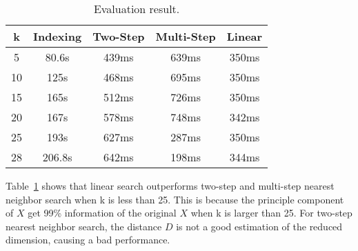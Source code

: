 \documentclass{article}
\begin{document}
\begin{table}[tbh]
  \center
  \footnotesize
  \begin{tabular}{c|c|c|c|c}
    \textbf{k} & \textbf{Indexing} & \textbf{Two-Step} & \textbf{Multi-Step} & \textbf{Linear}\\
    \hline
    5 & 80.6s & 439ms & 639ms & 350ms\\
    \hline
    10 & 125s & 468ms & 695ms & 350ms \\
    \hline
    15 & 165s & 512ms & 726ms & 350ms \\
    \hline
    20 & 167s & 578ms & 748ms & 342ms \\
    \hline
    25 & 193s & 627ms & 287ms & 350ms \\
    \hline
    28 & 206.8s & 642ms & 198ms & 344ms \\
  \end{tabular}
  \caption{Evaluation result.}
  \label{result}
\end{table}

Table~\ref{result} shows that linear search outperforms two-step and multi-step
nearest neighbor search when k is less than 25. This is because the principle
component of $X$ get 99\% information of the original $X$ when k is larger than
25. For two-step nearest
neighbor search, the distance $D$ is not a good estimation of the reduced
dimension, causing a bad performance.
\end{document}
